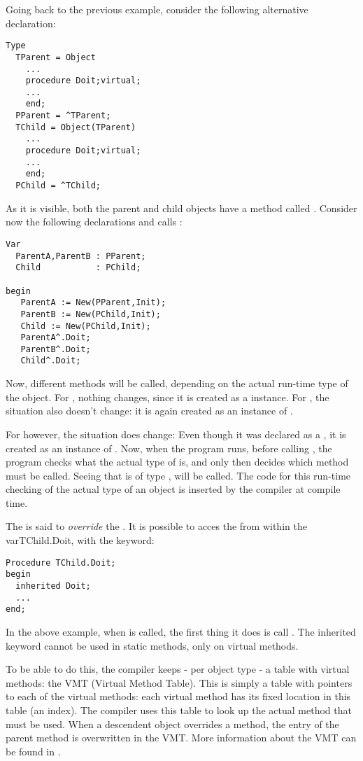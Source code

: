 Going back to the previous example, consider the following alternative
declaration:
\begin{verbatim}
Type
  TParent = Object
    ...
    procedure Doit;virtual;
    ...
    end;
  PParent = ^TParent;
  TChild = Object(TParent)
    ...
    procedure Doit;virtual;
    ...
    end;
  PChild = ^TChild;
\end{verbatim}
As it is visible, both the parent and child objects have a method called
. Consider now the following declarations and calls :
\begin{verbatim}
Var 
  ParentA,ParentB : PParent;
  Child           : PChild;

begin
   ParentA := New(PParent,Init);
   ParentB := New(PChild,Init);
   Child := New(PChild,Init);
   ParentA^.Doit;
   ParentB^.Doit;
   Child^.Doit;
\end{verbatim}
Now, different methods will be called, depending on the actual run-time type
of the object. For , nothing changes, since it is created as
a  instance. For , the situation also doesn't
change: it is again created as an instance of .

For  however, the situation does change: Even though it was
declared as a , it is created as an instance of .
Now, when the program runs, before calling , the program
checks what the actual type of  is, and only then decides which
method must be called. Seeing that  is of type ,
 will be called. The code for this run-time checking of the actual type of an object is
inserted by the compiler at compile time.

The  is said to {\em override} the
.  
It is possible to acces the  from within the
var{TChild.Doit}, with the  keyword:
\begin{verbatim}
Procedure TChild.Doit;
begin
  inherited Doit;
  ...
end;
\end{verbatim}
In the above example, when  is called, the first thing it
does is call .  The inherited keyword cannot be used in
static methods, only on virtual methods.

To be able to do this, the compiler keeps - per object type - a table with
virtual methods: the VMT (Virtual Method Table). This is simply a table 
with pointers to each of the virtual methods: each virtual method has its
fixed location in this table (an index). The compiler uses this table to 
look up the actual method that must be used. When a descendent object
overrides a method, the entry of the parent method is overwritten in the
VMT. More information about the VMT can be found in \progref.

